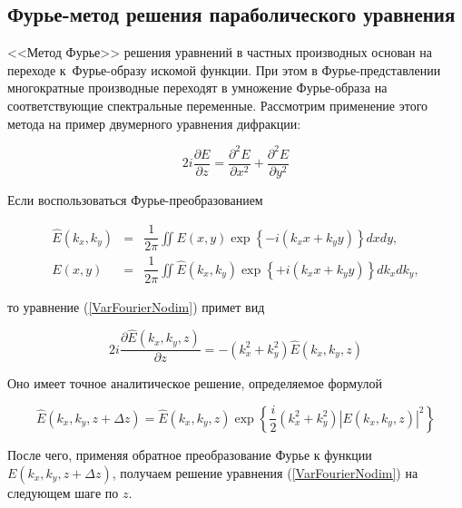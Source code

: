 \subsection{Фурье-метод решения параболического уравнения}
\label{subsec:AppFourier}

<<Метод Фурье>> решения уравнений в частных производных основан на переходе к~Фурье-образу искомой функции.
При этом в Фурье-представлении многократные производные переходят в умножение Фурье-образа на соответствующие спектральные переменные.
Рассмотрим применение этого метода на пример двумерного уравнения дифракции:

\begin{equation}\label{VarFourierNodim}
    2i\dfrac{\partial E}{\partial z} = \dfrac{\partial^2 E}{\partial x^2} + \dfrac{\partial^2 E}{\partial y^2}
\end{equation}

Если воспользоваться Фурье-преобразованием

\begin{eqnarray}
        \hat{E}(k_x, k_y) & = & \dfrac{1}{2\pi}\iint E(x, y) \exp\left\{-i(k_x x + k_y y)\right\} dx dy, \\
        E(x, y) & = & \dfrac{1}{2\pi}\iint \hat{E}(k_x, k_y) \exp\left\{+i(k_x x + k_y y)\right\} dk_x dk_y,
\end{eqnarray}

\noindent то уравнение (\ref{VarFourierNodim}) примет вид

\begin{equation}\label{DiffractionFourier}
    2i\frac{\partial \hat{E}(k_x, k_y, z)}{\partial z}= -(k_x^2 + k_y^2)\hat{E}(k_x, k_y, z)
\end{equation}

Оно имеет точное аналитическое решение, определяемое формулой

\begin{equation}\label{DiffractionFourierSolve}
    \hat{E}(k_x, k_y, z + \Delta z)= \hat{E}(k_x, k_y, z)\exp\left\{\dfrac{i}{2}(k_x^2 + k_y^2)\left|E(k_x, k_y, z)\right|^2\right\}
\end{equation}

После чего, применяя обратное преобразование Фурье к функции $E\left(k_x, k_y, z + \Delta z\right)$, получаем решение
уравнения (\ref{VarFourierNodim}) на следующем шаге по $z$.

